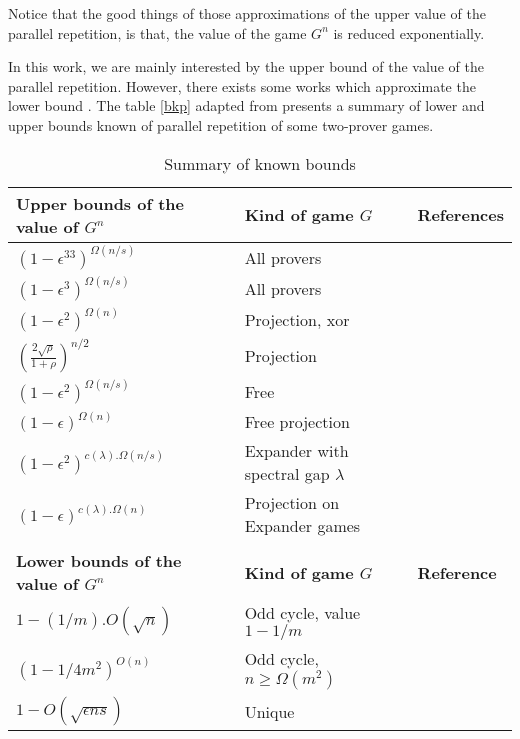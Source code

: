 Notice that the good things of those approximations of the upper value of the parallel repetition, is that,  the value of the game $G^n$ is reduced exponentially.

In this work, we are mainly interested by the upper bound of the value of the parallel repetition.  However, 
there exists some works which approximate the lower bound \citep{feige2007understanding,steurer2010improved, raz2011counterexample}. The table \eqref{bkp} adapted from \cite{tamaki2015parallel} presents a summary of lower and upper bounds known of parallel repetition of some two-prover games.


\begin{table}[h]
\begin{tabular}{lll}
\hline 
\textbf{Upper bounds of the value of $G^n$} &\textbf{ Kind of game $G$} & \textbf{References} \\ 
\hline 
$(1-\epsilon^33)^{\Omega(n/s) }$& All provers &  \cite{raz1998parallel} \\ 
$(1-\epsilon^3)^{\Omega(n/s) }$&  All provers &  \cite{holenstein2007parallel} \\ 
$(1-\epsilon^2)^{\Omega(n) }$&  Projection, xor & \cite{rao2011parallel,raz2010parallel}\\
$\left(\frac{2\sqrt{\rho}}{1+\rho} \right)^{n/2}$ & Projection & \cite{dinur2014analytical} \\
$(1-\epsilon^2)^{\Omega(n/s) }$& Free & \cite{barak2009strong}\\
$(1-\epsilon)^{\Omega(n) }$ & Free projection & \cite{barak2009strong}\\
$(1-\epsilon^2)^{c(\lambda). \Omega(n/s) }$& Expander with spectral gap $\lambda$ & \cite{raz2012strong}\\
$(1-\epsilon)^{c(\lambda). \Omega(n) }$& Projection on Expander games & \cite{raz2012strong}\\
\hline \\
\hline
\textbf{Lower bounds of the value of $G^n$} & \textbf{Kind of game $G$} & \textbf{Reference} \\ 
\hline 
$1-(1/m).{O(\sqrt{n})}$& Odd cycle, value $1-1/m$ & \cite{feige2007understanding}\\
$(1-1/4m^2)^{O(n)}$& Odd cycle, $n\geq \Omega(m^2)$ & \cite{raz2011counterexample}\\
$1-O(\sqrt{\epsilon ns})$ & Unique & \cite{steurer2010improved} \\
\hline 
\end{tabular} 
\caption{Summary of known bounds} \label{bkp}
\end{table}



